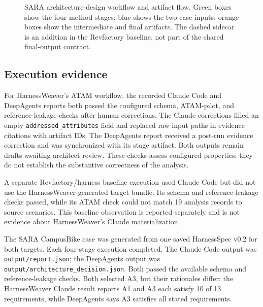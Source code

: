 \documentclass[10pt,conference]{IEEEtran}
\begin{document}
\begin{figure}[t]
{%
}
\caption{SARA architecture-design workflow and artifact flow. Green boxes show the four method stages; blue shows the two case inputs; orange boxes show the intermediate and final artifacts. The dashed sidecar is an addition in the Revfactory baseline, not part of the shared final-output contract.}
\label{fig:sara-workflow}
\end{figure}

\subsection{Execution evidence}

For HarnessWeaver's ATAM workflow, the recorded Claude Code and DeepAgents reports both passed the configured schema, ATAM-pilot, and reference-leakage checks after human corrections. The Claude corrections filled an empty \texttt{addressed\_attributes} field and replaced raw input paths in evidence citations with artifact IDs. The DeepAgents report received a post-run evidence correction and was synchronized with its stage artifact. Both outputs remain drafts awaiting architect review. These checks assess configured properties; they do not establish the substantive correctness of the analysis.

A separate Revfactory/harness baseline execution used Claude Code but did not use the HarnessWeaver-generated target bundle. Its schema and reference-leakage checks passed, while its ATAM check could not match 19 analysis records to source scenarios. This baseline observation is reported separately and is not evidence about HarnessWeaver's Claude materialization.

The SARA CampusBike case was generated from one saved HarnessSpec v0.2 for both targets. Each four-stage execution completed. The Claude Code output was \texttt{output/report.json}; the DeepAgents output was \texttt{output/architecture\_decision.json}. Both passed the available schema and reference-leakage checks. Both selected A3, but their rationales differ: the HarnessWeaver Claude result reports A1 and A3 each satisfy 10 of 13 requirements, while DeepAgents says A3 satisfies all stated requirements.
\end{document}
